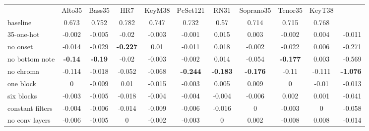

\begin{table}[]
    \begin{tabular}{lcccccccccr}
                        & Alto35         & Bass35         & HR7             & KeyM38          & PcSet121        & RN31            & Soprano35       & Tenor35         & KeyT38          & \multicolumn{1}{l}{} \\
    baseline            & 0.673          & 0.752          & 0.782           & 0.747           & 0.732           & 0.57            & 0.714           & 0.715           & 0.768           & \multicolumn{1}{l}{} \\
    35-one-hot          & -0.002         & -0.005         & -0.02           & -0.003          & -0.001          & 0.015           & 0.003           & -0.002          & 0.004           & -0.011               \\
    no onset            & -0.014         & -0.029         & \textbf{-0.227} & 0.01            & -0.011          & 0.018           & -0.002          & -0.022          & 0.006           & -0.271               \\
    no bottom note      & \textbf{-0.14} & \textbf{-0.19} & -0.02           & -0.003          & -0.002          & 0.014           & -0.054          & \textbf{-0.177} & 0.003           & -0.569               \\
    no chroma           & -0.114         & -0.018         & -0.052          & -0.068          & \textbf{-0.244} & \textbf{-0.183} & \textbf{-0.176} & -0.11           & -0.111          & \textbf{-1.076}      \\
    one block           & 0              & -0.009         & 0.01            & -0.015          & -0.003          & 0.005           & 0.009           & 0               & -0.01           & -0.013               \\
    six blocks          & -0.003         & -0.005         & -0.018          & -0.004          & -0.004          & -0.004          & -0.006          & 0.002           & 0.001           & -0.041               \\
    constant filters    & -0.004         & -0.006         & -0.014          & -0.009          & -0.006          & -0.016          & 0               & -0.003          & 0               & -0.058               \\
    no conv layers      & -0.006         & -0.005         & 0               & -0.002          & -0.003          & 0               & 0.002           & -0.008          & 0.008           & -0.014               \\

\end{tabular}
\end{table}
